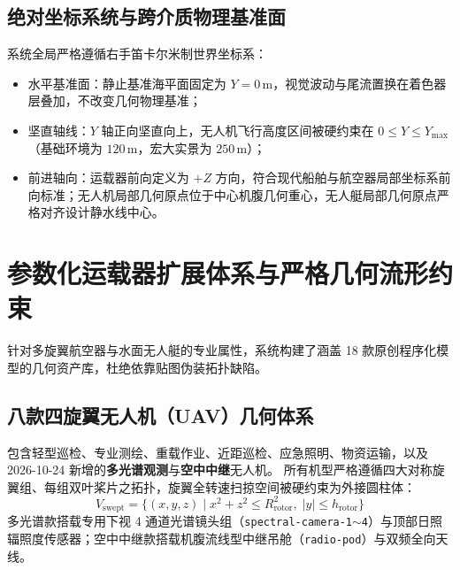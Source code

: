\documentclass[UTF8,a4paper,11pt,fontset=fandol]{ctexart}
\begin{document}
\subsection{绝对坐标系统与跨介质物理基准面}
系统全局严格遵循右手笛卡尔米制世界坐标系：
\begin{itemize}
  \item 水平基准面：静止基准海平面固定为 $Y = 0\,\text{m}$，视觉波动与尾流置换在着色器层叠加，不改变几何物理基准；
  \item 坚直轴线：$Y$ 轴正向坚直向上，无人机飞行高度区间被硬约束在 $0 \le Y \le Y_{\max}$（基础环境为 $120\,\text{m}$，宏大实景为 $250\,\text{m}$）；
  \item 前进轴向：运载器前向定义为 $+Z$ 方向，符合现代船舶与航空器局部坐标系前向标准；无人机局部几何原点位于中心机腹几何重心，无人艇局部几何原点严格对齐设计静水线中心。
\end{itemize}

\section{参数化运载器扩展体系与严格几何流形约束}

针对多旋翼航空器与水面无人艇的专业属性，系统构建了涵盖 18 款原创程序化模型的几何资产库，杜绝依靠贴图伪装拓扑缺陷。

\subsection{八款四旋翼无人机（UAV）几何体系}
包含轻型巡检、专业测绘、重载作业、近距巡检、应急照明、物资运输，以及 2026-10-24 新增的\textbf{多光谱观测}与\textbf{空中中继}无人机。
所有机型严格遵循四大对称旋翼组、每组双叶桨片之拓扑，旋翼全转速扫掠空间被硬约束为外接圆柱体：
\begin{equation}
V_{\text{swept}} = \{ (x, y, z) \mid x^2 + z^2 \le R_{\text{rotor}}^2, \; |y| \le h_{\text{rotor}} \}
\end{equation}
多光谱款搭载专用下视 4 通道光谱镜头组（\texttt{spectral-camera-1$\sim$4}）与顶部日照辐照度传感器；空中中继款搭载机腹流线型中继吊舱（\texttt{radio-pod}）与双频全向天线。
\end{document}
